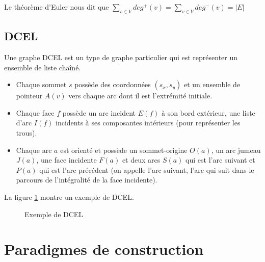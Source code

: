 \documentclass[11pt,a4paper]{report}
\begin{document}
Le théorème d'Euler nous dit que $\sum_{v\in V} deg^+(v) = \sum_{v\in V} deg^-(v) = |E|$

\section{DCEL}

Une graphe DCEL est un type de graphe particulier qui est représenter un ensemble de liste chaîné.
\begin{itemize}
    \item Chaque sommet $s$ possède des coordonnées $(s_x,s_y)$ et un ensemble de pointeur $A(v)$ vers chaque arc dont il est l'extrémité initiale.
    \item Chaque face $f$ possède un arc incident $E(f)$ à son bord extérieur, une liste d'arc $I(f)$ incidents à ses composantes intérieurs (pour représenter les trous).
    \item Chaque arc $a$ est orienté et possède un sommet-origine $O(a)$, un arc jumeau $J(a)$, une face incidente $F(a)$ et deux arcs $S(a)$ qui est l'arc suivant et $P(a)$ qui est l'arc précédent (on appelle l'arc suivant, l'arc qui suit dans le parcours de l'intégralité de la face incidente).
\end{itemize}

La figure \ref{fig:DCEL} montre un exemple de DCEL.

\begin{figure}
    \centering
    \caption{Exemple de DCEL}
    \label{fig:DCEL}
\end{figure}

\chapter{Paradigmes de construction}
\end{document}
